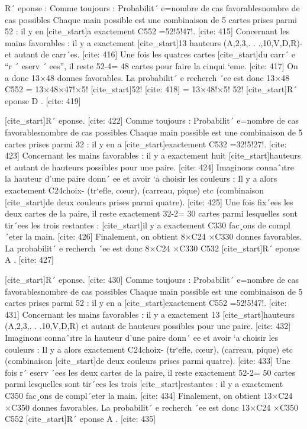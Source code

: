 R´ eponse :
 Comme toujours :
 Probabilit´ e=nombre de cas favorablesnombre de cas possibles
 Chaque main possible est une combinaison de 5 cartes prises parmi 52 : il y en
 [cite_start]a exactement C552 =52!5!47!. [cite: 415]
Concernant les mains favorables : il y a exactement
 [cite_start]13 hauteurs (A,2,3,. . .,10,V,D,R)- et autant de carr´es. [cite: 416]
Une fois les quatres cartes 
 [cite_start]du carr´ e “r ´ eserv ´ ees”, il reste 52-4= 48 cartes pour faire la cinqui `eme. [cite: 417]
On a donc 
 13×48 donnes favorables.
 La probabilit´ e recherch ´ee est donc 
 13×48
 C552
 =
 13×48×47!×5!
 [cite_start]52! [cite: 418]
=
 13×48!×5!
 52!
 [cite_start]R´ eponse D . [cite: 419]

[cite_start]R´ eponse. [cite: 422]
Comme toujours :
 Probabilit´ e=nombre de cas favorablesnombre de cas possibles
 Chaque main possible est une combinaison de 5 cartes prises parmi 32 : il y en a
 [cite_start]exactement C532 =32!5!27!. [cite: 423]
Concernant les mains favorables : il y a exactement huit
 [cite_start]hauteurs et autant de hauteurs possibles pour une paire. [cite: 424]
Imaginons connaˆıtre la hauteur d’une paire donn´ ee et avoir `a choisir les couleurs : 
 Il y a alors exactement C24choix- (tr`efle, cœur), (carreau, pique) etc (combinaison 
 [cite_start]de deux couleurs prises parmi quatre). [cite: 425]
Une fois fix´ees les deux cartes de la paire, 
 il reste exactement 32-2= 30 cartes parmi lesquelles sont tir´ees les trois restantes : 
 [cite_start]il y a exactement C330 fac¸ons de compl´eter la main. [cite: 426]
Finalement, on obtient 
 8×C24 ×C330
 donnes favorables.
 La probabilit´ e recherch ´ee est donc 
 8×C24 ×C330
 C532
 [cite_start]R´ eponse A . [cite: 427]

[cite_start]R´ eponse. [cite: 430]
Comme toujours :
 Probabilit´ e=nombre de cas favorablesnombre de cas possibles
 Chaque main possible est une combinaison de 5 cartes prises parmi 52 : il y en a
 [cite_start]exactement C552 =52!5!47!. [cite: 431]
Concernant les mains favorables : il y a exactement 13
 [cite_start]hauteurs (A,2,3,. . .10,V,D,R) et autant de hauteurs possibles pour une paire. [cite: 432]
Imaginons connaˆıtre la hauteur d’une paire donn´ ee et avoir `a choisir les couleurs : 
 Il y a alors exactement C24choix- (tr`efle, cœur), (carreau, pique) etc (combinaison 
 [cite_start]de deux couleurs prises parmi quatre). [cite: 433]
Une fois r´ eserv ´ees les deux cartes de la 
 paire, il reste exactement 52-2= 50 cartes parmi lesquelles sont tir´ees les trois 
 [cite_start]restantes : il y a exactement C350 fac¸ons de compl´eter la main. [cite: 434]
Finalement, on 
 obtient
 13×C24 ×C350
 donnes favorables.
 La probabilit´ e recherch ´ee est donc 
 13×C24 ×C350
 C552
 [cite_start]R´ eponse A . [cite: 435]

